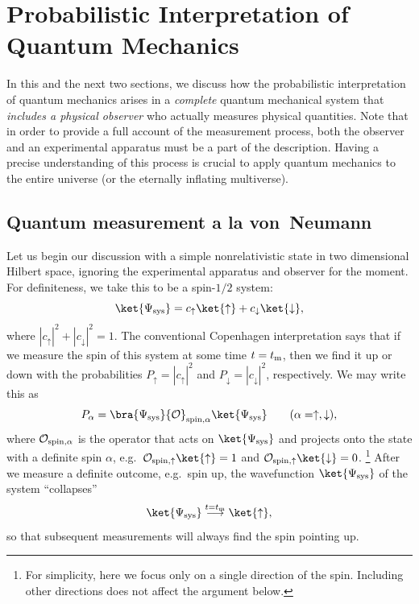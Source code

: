 \documentclass[12pt]{article}
\begin{document}
\section{Probabilistic Interpretation of Quantum Mechanics}
\label{sec:interpret}

In this and the next two sections, we discuss how the probabilistic 
interpretation of quantum mechanics arises in a {\it complete} quantum 
mechanical system that {\it includes a physical observer} who actually 
measures physical quantities.  Note that in order to provide a full 
account of the measurement process, both the observer and an experimental 
apparatus must be a part of the description.  Having a precise understanding 
of this process is crucial to apply quantum mechanics to the entire 
universe (or the eternally inflating multiverse).


\subsection{Quantum measurement a la von~Neumann}
\label{subsec:modern}

Let us begin our discussion with a simple nonrelativistic state in two 
dimensional Hilbert space, ignoring the experimental apparatus and observer 
for the moment.  For definiteness, we take this to be a spin-$1/2$ system:
%
\begin{equation}
  \ket{\Psi_{\rm sys}} = c_\uparrow \ket{\uparrow} 
    + c_\downarrow \ket{\downarrow},
\label{eq:NR-1}
\end{equation}
%
where $|c_\uparrow|^2 + |c_\downarrow|^2 = 1$.  The conventional Copenhagen 
interpretation says that if we measure the spin of this system at some 
time $t = t_{\rm m}$, then we find it up or down with the probabilities 
$P_{\uparrow} = |c_\uparrow|^2$ and $P_{\downarrow} = |c_\downarrow|^2$, 
respectively.  We may write this as
%
\begin{equation}
  P_\alpha = \bra{\Psi_{\rm sys}} {\cal O}_{{\rm spin},\alpha}
    \ket{\Psi_{\rm sys}}
\qquad
  (\alpha = \uparrow,\downarrow),
\label{eq:NR-P_alpha}
\end{equation}
%
where ${\cal O}_{{\rm spin},\alpha}$ is the operator that acts on 
$\ket{\Psi_{\rm sys}}$ and projects onto the state with a definite spin 
$\alpha$, e.g.\ ${\cal O}_{{\rm spin},\uparrow} \ket{\uparrow} = 1$ 
and ${\cal O}_{{\rm spin},\uparrow} \ket{\downarrow} = 0$.%
\footnote{For simplicity, here we focus only on a single direction of 
 the spin.  Including other directions does not affect the argument below.}
After we measure a definite outcome, e.g.\ spin up, the wavefunction 
$\ket{\Psi_{\rm sys}}$ of the system ``collapses''
%
\begin{equation}
  \ket{\Psi_{\rm sys}} \stackrel{t=t_{\rm m}}{\longrightarrow} 
    \ket{\uparrow},
\label{eq:NR-collapse}
\end{equation}
%
so that subsequent measurements will always find the spin pointing up.
\end{document}
